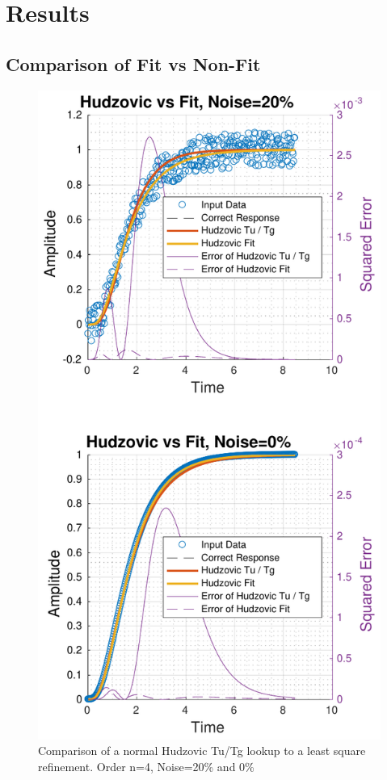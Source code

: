 \section{Results}

\subsection{Comparison of Fit vs Non-Fit}

\begin{figure}
    \includegraphics[width=\linewidth]{images/hudzovic_vs_fit}
    \caption{Comparison of a normal Hudzovic Tu/Tg lookup to a least square refinement. Order n=4, Noise=20\% and 0\%}
    \label{fig:hudzovic_vs_fit}
\end{figure}

